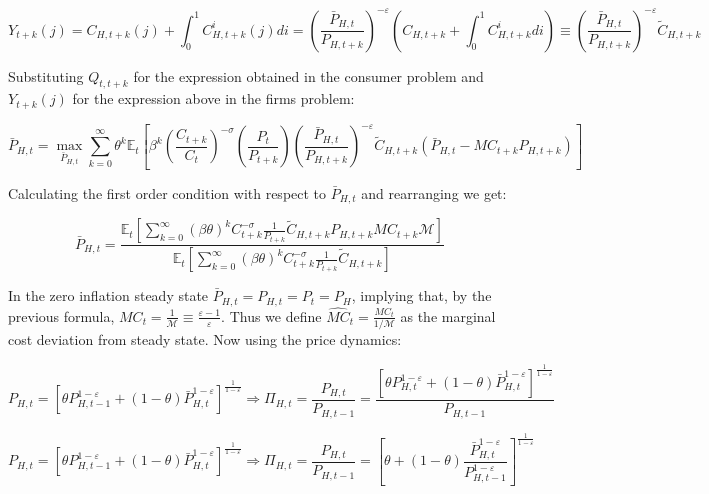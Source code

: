 \documentclass{article}
\newcommand{\Et}{\mathbb{E}_t}
\begin{document}
\begin{equation}
    Y_{t+k}(j) = C_{H,t+k}(j) + \int_0^1 C^i_{H, t+k}(j) di = \left( \frac{\bar P_{H,t}}{P_{H,t+k}} \right)^{-\varepsilon} \left(C_{H,t+k} +  \int_0^1 C^i_{H, t+k} di \right) \equiv \left( \frac{\bar P_{H,t}}{P_{H,t+k}} \right)^{-\varepsilon} \tilde C_{H,t+k}
\end{equation}

Substituting $Q_{t, t+k}$ for the expression obtained in the consumer problem and $Y_{t+k}(j)$ for the expression above in the firms problem:

\begin{equation}
    \label{}
    \bar P_{H,t} = \max_{\bar P_{H,t}} \sum^\infty_{k=0} \theta^k \Et \left[ \beta^k \left( \frac{C_{t+k}}{C_t} \right)^{-\sigma} \left( \frac{P_{t}}{P_{t+k}} \right) \left( \frac{\bar P_{H,t}}{P_{H,t+k}} \right)^{-\varepsilon} \tilde C_{H,t+k} (\bar P_{H,t} - MC_{t+k} P_{H,t+k})  \right]
\end{equation}

Calculating the first order condition with respect to $\bar P_{H,t}$ and rearranging we get:

\begin{equation}
    \bar P_{H,t} =  \frac{\Et\left[ \sum^\infty_{k=0} (\beta\theta)^k C_{t+k}^{-\sigma} \frac{1}{P_{t+k}}\tilde C_{H,t+k} P_{H,t+k} MC_{t+k} \mathcal M \right] }{\Et\left[ \sum^\infty_{k=0} (\beta\theta)^k C_{t+k}^{-\sigma} \frac{1}{P_{t+k}} \tilde C_{H,t+k}  \right]}
\end{equation}

In the zero inflation steady state $\bar P_{H,t} = P_{H,t} = P_{t} = P_H$, implying that, by the previous formula, $MC_{t}  = \frac{1}{\mathcal M} \equiv \frac{\varepsilon-1}{\varepsilon}$. Thus we define $\widehat{MC}_t = \frac{MC_t}{1/ \mathcal M}$ as the marginal cost deviation from steady state. Now using the price dynamics:

\begin{equation}
    P_{H,t} = [ \theta P_{H,t-1}^{1-\varepsilon} + (1-\theta) \bar P_{H,t}^{1-\varepsilon}]^\frac{1}{1-\varepsilon} \Rightarrow \Pi_{H,t} = \frac{P_{H,t}}{P_{H,t-1}} =  \frac{\left[ \theta P_{H,t}^{1-\varepsilon} + (1-\theta) \bar P_{H,t}^{1-\varepsilon}\right]^\frac{1}{1-\varepsilon}}{P_{H,t-1}} 
\end{equation}

\begin{equation}
    P_{H,t} = [ \theta P_{H,t-1}^{1-\varepsilon} + (1-\theta) \bar P_{H,t}^{1-\varepsilon}]^\frac{1}{1-\varepsilon} \Rightarrow \Pi_{H,t} = \frac{P_{H,t}}{P_{H,t-1}} =  \left[ \theta + (1-\theta) \frac{\bar P_{H,t}^{1-\varepsilon}}{P_{H,t-1}^{1-\varepsilon}} \right]^\frac{1}{1-\varepsilon} 
\end{equation}
\end{document}
